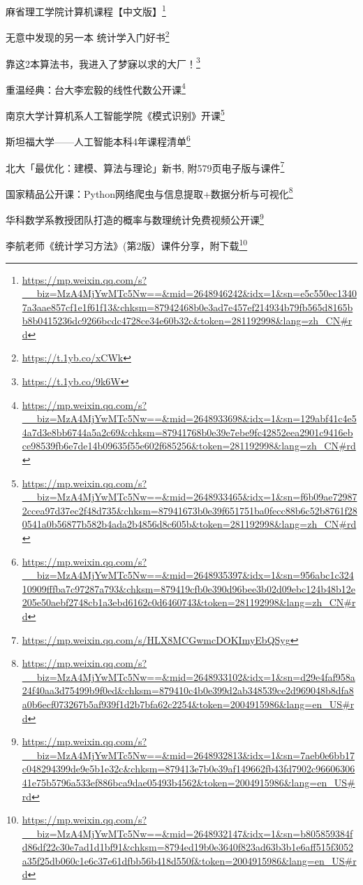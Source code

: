 \documentclass[]{ctexbook}
\renewcommand{\href}[2]{#2\footnote{\url{#1}}}
\begin{document}
\href{https://mp.weixin.qq.com/s?__biz=MzA4MjYwMTc5Nw==\&mid=2648946242\&idx=1\&sn=e5c550ec13407a3aae857cf1e1f61f13\&chksm=87942468b0e3ad7e457ef214934b79fb565d8165bb8b0415236dc9266bcdc4728ce34e60b32c\&token=281192998\&lang=zh_CN\#rd}{麻省理工学院计算机课程【中文版】}

\href{https://t.1yb.co/xCWk}{无意中发现的另一本 统计学入门好书}

\href{https://t.1yb.co/9k6W}{靠这2本算法书，我进入了梦寐以求的大厂！}

\href{https://mp.weixin.qq.com/s?__biz=MzA4MjYwMTc5Nw==\&mid=2648933698\&idx=1\&sn=129abf41c4e54a7d3e8bb6744a5a2c69\&chksm=87941768b0e39e7ebe9fc42852eea2901c9416ebce98539fb6e7de14b09635f55e602f685256\&token=281192998\&lang=zh_CN\#rd}{重温经典：台大李宏毅的线性代数公开课}

\href{https://mp.weixin.qq.com/s?__biz=MzA4MjYwMTc5Nw==\&mid=2648933465\&idx=1\&sn=f6b09ae729872ccea97d37ec2f48d735\&chksm=87941673b0e39f651751ba0fecc88b6c52b8761f280541a0b56877b582b4ada2b4856d8c605b\&token=281192998\&lang=zh_CN\#rd}{南京大学计算机系人工智能学院《模式识别》开课}

\href{https://mp.weixin.qq.com/s?__biz=MzA4MjYwMTc5Nw==\&mid=2648935397\&idx=1\&sn=956abc1c32410909fffba7c97287a793\&chksm=879419cfb0e390d96bee3b02d09ebc124b48b12e205e50aebf2748cb1a3ebd6162c0d6460743\&token=281192998\&lang=zh_CN\#rd}{斯坦福大学------人工智能本科4年课程清单}

\href{https://mp.weixin.qq.com/s/HLX8MCGwmcDOKImyEbQSyg}{北大「最优化：建模、算法与理论」新书, 附579页电子版与课件}

\href{https://mp.weixin.qq.com/s?__biz=MzA4MjYwMTc5Nw==\&mid=2648933102\&idx=1\&sn=d29e4faf958a24f40aa3d75499b9f0ed\&chksm=879410c4b0e399d2ab348539ce2d969048b8dfa8a0b6ecf073267b5af939f1d2b7bfa62c2254\&token=2004915986\&lang=en_US\#rd}{国家精品公开课：Python网络爬虫与信息提取+数据分析与可视化}

\href{https://mp.weixin.qq.com/s?__biz=MzA4MjYwMTc5Nw==\&mid=2648932813\&idx=1\&sn=7aeb0e6bb17c048294399de9e5b1e32c\&chksm=879413e7b0e39af149662fb43fd7902c9660630641e75b5796a533ef886bca9dae05493b4562\&token=2004915986\&lang=en_US\#rd}{华科数学系教授团队打造的概率与数理统计免费视频公开课}

\href{https://mp.weixin.qq.com/s?__biz=MzA4MjYwMTc5Nw==\&mid=2648932147\&idx=1\&sn=b805859384fd86df22c30e7ad1d1bf91\&chksm=8794ed19b0e3640f823ad63b3b1e6aff515f3052a35f25db060c1e6c37e61dfbb56b418d550f\&token=2004915986\&lang=en_US\#rd}{李航老师《统计学习方法》(第2版）课件分享，附下载}
\end{document}

